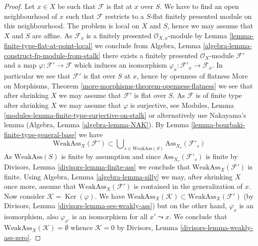 \documentclass[10pt,a4paper]{amsart}
\theoremstyle{plain}
\theoremstyle{definition}
\theoremstyle{remark}
\numberwithin{equation}{subsection}
\def\Ker{\mathop{\mathrm{Ker}}}
\begin{document}
\begin{proof}
Let $x \in X$ be such that $\mathcal{F}$ is flat at $x$ over $S$.
We have to find an open neighbourhood of $x$ such that $\mathcal{F}$ restricts
to a $S$-flat finitely presented module on this neighbourhood.
The problem is local on $X$ and $S$, hence we may assume that $X$ and $S$
are affine. As $\mathcal{F}_x$ is a finitely presented
$\mathcal{O}_{X, x}$-module by
Lemma \ref{lemma-finite-type-flat-at-point-local}
we conclude from
Algebra, Lemma \ref{algebra-lemma-construct-fp-module-from-stalk}
there exists a finitely presented $\mathcal{O}_X$-module $\mathcal{F}'$
and a map $\varphi : \mathcal{F}' \to \mathcal{F}$ which induces
an isomorphism $\varphi_x : \mathcal{F}'_x \to \mathcal{F}_x$. In particular
we see that $\mathcal{F}'$ is flat over $S$ at $x$, hence by openness
of flatness
More on Morphisms, Theorem \ref{more-morphisms-theorem-openness-flatness}
we see that after shrinking $X$ we may assume that
$\mathcal{F}'$ is flat over $S$. As $\mathcal{F}$ is of finite type
after shrinking $X$ we may assume that $\varphi$ is surjective, see
Modules, Lemma \ref{modules-lemma-finite-type-surjective-on-stalk}
or alternatively use Nakayama's lemma
(Algebra, Lemma \ref{algebra-lemma-NAK}).
By
Lemma \ref{lemma-bourbaki-finite-type-general-base}
we have
$$
\text{WeakAss}_X(\mathcal{F}') \subset
\bigcup\nolimits_{s \in \text{WeakAss}(S)} \text{Ass}_{X_s}(\mathcal{F}'_s)
$$
As $\text{WeakAss}(S)$ is finite by assumption and since
$\text{Ass}_{X_s}(\mathcal{F}'_s)$ is finite by
Divisors, Lemma \ref{divisors-lemma-finite-ass}
we conclude that $\text{WeakAss}_X(\mathcal{F}')$ is finite. Using
Algebra, Lemma \ref{algebra-lemma-silly}
we may, after shrinking $X$ once more, assume that
$\text{WeakAss}_X(\mathcal{F}')$ is contained in the generalization
of $x$. Now consider $\mathcal{K} = \Ker(\varphi)$. We have
$\text{WeakAss}_X(\mathcal{K}) \subset \text{WeakAss}_X(\mathcal{F}')$
(by
Divisors, Lemma \ref{divisors-lemma-ses-weakly-ass})
but on the other hand, $\varphi_x$ is an isomorphism, also $\varphi_{x'}$
is an isomorphism for all $x' \leadsto x$. We conclude that
$\text{WeakAss}_X(\mathcal{K}) = \emptyset$ whence
$\mathcal{K} = 0$ by
Divisors, Lemma \ref{divisors-lemma-weakly-ass-zero}.
\end{proof}
\end{document}
